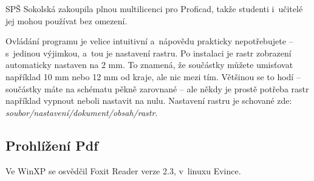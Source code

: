 SPŠ Sokolská zakoupila plnou multilicenci pro Proficad, takže studenti i~učitelé jej mohou používat bez omezení. 

Ovládání programu je velice intuitivní a~nápovědu prakticky nepotřebujete -- s~jedinou výjimkou, a~tou je nastavení rastru. 
Po instalaci je rastr zobrazení automaticky nastaven na 2 mm. To znamená, že součástky 
můžete umisťovat například 10 mm nebo 12 mm od kraje, ale nic mezi tím. 
Většinou se to hodí -- součástky máte na schématu pěkně zarovnané -- ale 
někdy je prostě potřeba rastr například vypnout neboli nastavit na nulu. 
Nastavení rastru je schované zde:  {\it soubor/nastavení/dokument/obsah/rastr}.

\subsection{Prohlížení Pdf}

Ve WinXP se osvědčil Foxit Reader verze 2.3, v~linuxu Evince.  
